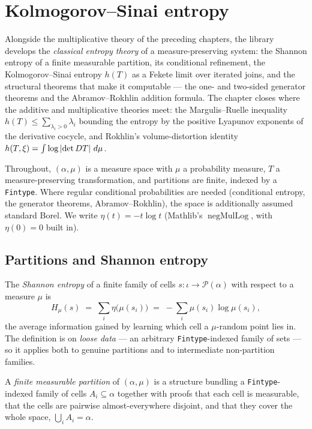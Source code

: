\chapter{Kolmogorov--Sinai entropy}
\label{chap:ksentropy}

Alongside the multiplicative theory of the preceding chapters, the library develops the
\emph{classical entropy theory} of a measure-preserving system: the Shannon entropy of a finite
measurable partition, its conditional refinement, the Kolmogorov--Sinai entropy
\(h(T)\) as a Fekete limit over iterated joins, and the structural theorems that make it
computable --- the one- and two-sided generator theorems and the Abramov--Rokhlin addition
formula. The chapter closes where the additive and multiplicative theories meet: the
Margulis--Ruelle inequality \(h(T)\le\sum_{\lambda_i>0}\lambda_i\) bounding the entropy by the
positive Lyapunov exponents of the derivative cocycle, and Rokhlin's volume-distortion identity
\(h(T,\xi)=\int\log\left\lvert \det DT \right\rvert\,d\mu\).

Throughout, \((\alpha,\mu)\) is a measure space with \(\mu\) a probability measure, \(T\) a
measure-preserving transformation, and partitions are finite, indexed by a \texttt{Fintype}.
Where regular conditional probabilities are needed (conditional entropy, the generator theorems,
Abramov--Rokhlin), the space is additionally assumed standard Borel. We write
\(\eta(t)=-t\log t\) (Mathlib's \(\operatorname{negMulLog}\), with \(\eta(0)=0\) built in).

\section{Partitions and Shannon entropy}

\begin{definition}\label{entropy}
  \leanok
  The \emph{Shannon entropy} of a finite family of cells \(s:\iota\to\mathcal P(\alpha)\) with
  respect to a measure \(\mu\) is
  \[
    H_\mu(s) \;=\; \sum_i \eta\bigl(\mu(s_i)\bigr) \;=\; -\sum_i \mu(s_i)\log\mu(s_i),
  \]
  the average information gained by learning which cell a \(\mu\)-random point lies in. The
  definition is on \emph{loose data} --- an arbitrary \texttt{Fintype}-indexed family of sets ---
  so it applies both to genuine partitions and to intermediate non-partition families.
\end{definition}

\begin{definition}\label{MeasurePartition}
  \leanok
  A \emph{finite measurable partition} of \((\alpha,\mu)\) is a structure bundling a
  \texttt{Fintype}-indexed family of cells \(A_i\subseteq\alpha\) together with proofs that each
  cell is measurable, that the cells are pairwise almost-everywhere disjoint, and that they cover
  the whole space, \(\bigcup_i A_i=\alpha\).
\end{definition}

